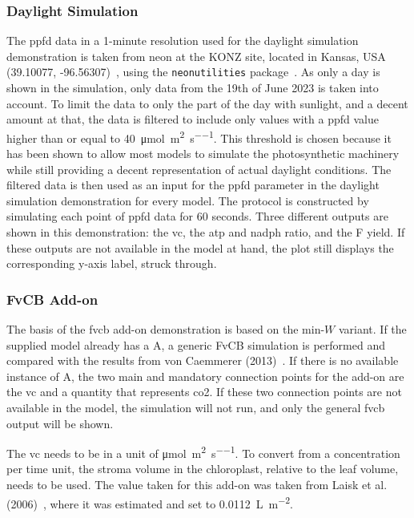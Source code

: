 \subsubsection{Daylight Simulation}
The \gls{ppfd} data in a 1-minute resolution used for the daylight simulation demonstration is taken from \gls{neon} at the KONZ site, located in Kansas, USA (39.10077, -96.56307)~\cite{nationalecologicalobservatorynetworkneonPhotosyntheticallyActiveRadiation2023}, using the \verb|neonutilities| package~\cite{lunchNeonutilitiesPackageAccessing}. As only a day is shown in the simulation, only data from the 19th of June 2023 is taken into account. To limit the data to only the part of the day with sunlight, and a decent amount at that, the data is filtered to include only values with a \gls{ppfd} value higher than or equal to \qty{40}{\micro\mol\per\square\meter\per\second}. This threshold is chosen because it has been shown to allow most models to simulate the photosynthetic machinery while still providing a decent representation of actual daylight conditions. The filtered data is then used as an input for the \gls{ppfd} parameter in the daylight simulation demonstration for every model. The protocol is constructed by simulating each point of \gls{ppfd} data for 60 seconds. Three different outputs are shown in this demonstration: the \gls{vc}, the \gls{atp} and \gls{nadph} ratio, and the \gls{F} yield. If these outputs are not available in the model at hand, the plot still displays the corresponding y-axis label, struck through.

\subsubsection{FvCB Add-on}
The basis of the \gls{fvcb} add-on demonstration is based on the min-$W$ variant. If the supplied model already has a \gls{A}, a generic FvCB simulation is performed and compared with the results from von Caemmerer (2013)~\cite{voncaemmererSteadystateModelsPhotosynthesis2013}. If there is no available instance of \gls{A}, the two main and mandatory connection points for the add-on are the \gls{vc} and a quantity that represents \gls{co2}. If these two connection points are not available in the model, the simulation will not run, and only the general \gls{fvcb} output will be shown.

The \gls{vc} needs to be in a unit of \unit{\micro\mole\per\square\meter\per\second}. To convert from a concentration per time unit, the stroma volume in the chloroplast, relative to the leaf volume, needs to be used. The value taken for this add-on was taken from Laisk et al. (2006)~\cite{laiskC3PhotosynthesisSilico2007}, where it was estimated and set to \qty{0.0112}{\liter\per\square\meter}.

